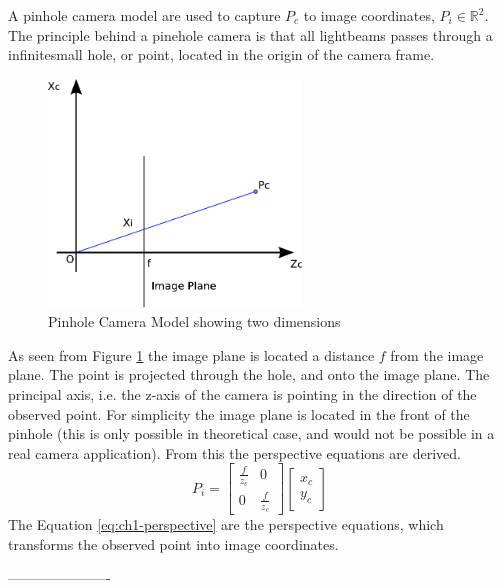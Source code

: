 	A pinhole camera model are used to capture $P_c$ to image coordinates, $P_i \in
	\mathbb{R}^2$. 
	The principle behind a pinehole camera is that all lightbeams passes through a
	infinitesmall hole, or point, located in the origin of the camera frame.   
	\begin{figure}[hbtp]
		\centering
		\includegraphics[width=0.6\textwidth]{pics/pinhole_model}
		\caption{Pinhole Camera Model showing two dimensions}
		\label{fig:ch1-pinhole}
	\end{figure}
			
	As seen from Figure \ref{fig:ch1-pinhole} the image plane is located a distance $f$ from the image plane. 
	The point is projected through the hole, and onto the image plane. The principal axis, i.e. the z-axis of the
	camera is pointing
	in the direction of the observed point. For simplicity the image plane is located in the front of the
	pinhole (this is only possible in theoretical case, and would not be possible in a real camera application).
    From this the perspective equations are derived. \cite{robotbok}
	\begin{equation}
		\label{eq:ch1-perspective}
		P_i = \left[ \begin{array}{cc}
					\frac{f}{z_c} & 0 \\
					0	& \frac{f}{z_c} 
				\end{array} \right] 
				\left[ \begin{array}{c}
					x_c \\
					y_c
					\end{array} \right]
	\end{equation}
	The Equation \eqref{eq:ch1-perspective} are the perspective equations, which transforms the observed 
	point into image coordinates. 



----------------------


